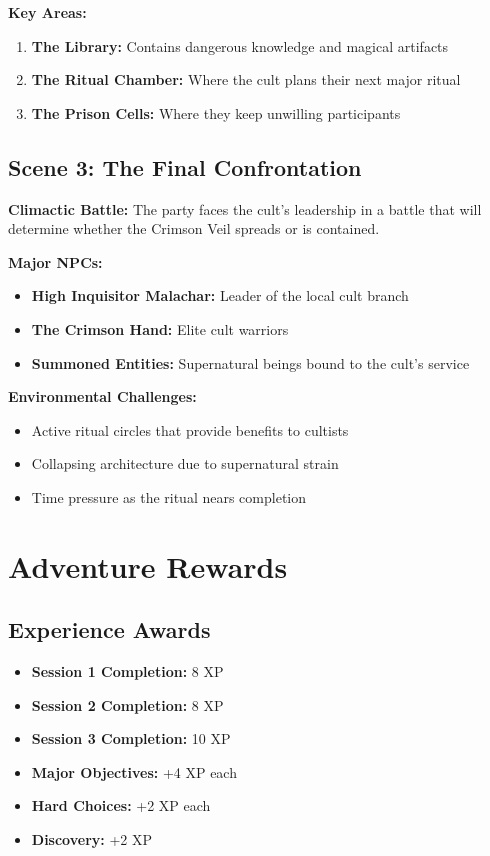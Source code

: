 \documentclass[11pt]{article}
\begin{document}
\textbf{Key Areas:}
\begin{enumerate}[leftmargin=*]
\item \textbf{The Library:} Contains dangerous knowledge and magical artifacts
\item \textbf{The Ritual Chamber:} Where the cult plans their next major ritual
\item \textbf{The Prison Cells:} Where they keep unwilling participants
\end{enumerate}

\subsection*{Scene 3: The Final Confrontation}
\textbf{Climactic Battle:} The party faces the cult's leadership in a battle that will determine whether the Crimson Veil spreads or is contained.

\textbf{Major NPCs:}
\begin{itemize}[leftmargin=*]
\item \textbf{High Inquisitor Malachar:} Leader of the local cult branch
\item \textbf{The Crimson Hand:} Elite cult warriors
\item \textbf{Summoned Entities:} Supernatural beings bound to the cult's service
\end{itemize}

\textbf{Environmental Challenges:}
\begin{itemize}[leftmargin=*]
\item Active ritual circles that provide benefits to cultists
\item Collapsing architecture due to supernatural strain
\item Time pressure as the ritual nears completion
\end{itemize}

\section*{Adventure Rewards}

\subsection*{Experience Awards}
\begin{itemize}[leftmargin=*]
\item \textbf{Session 1 Completion:} 8 XP
\item \textbf{Session 2 Completion:} 8 XP
\item \textbf{Session 3 Completion:} 10 XP
\item \textbf{Major Objectives:} +4 XP each
\item \textbf{Hard Choices:} +2 XP each
\item \textbf{Discovery:} +2 XP
\end{itemize}
\end{document}
